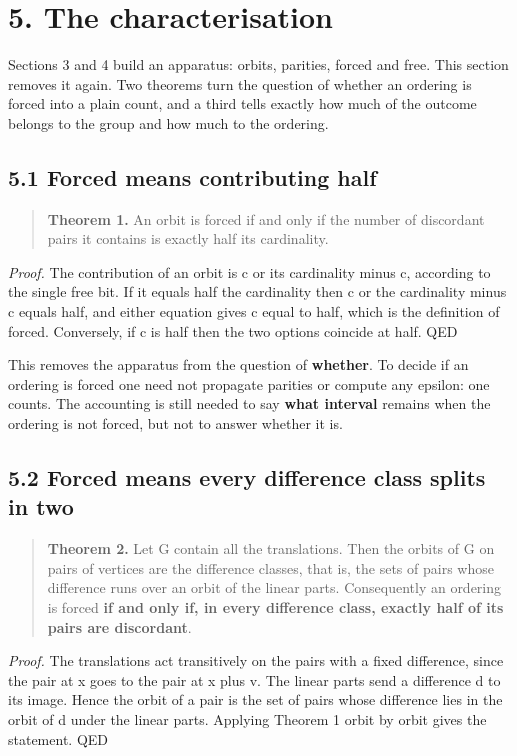 \documentclass[11pt,a4paper]{article}
\begin{document}
\section*{5. The characterisation}

Sections 3 and 4 build an apparatus: orbits, parities, forced and free. This section removes it again. Two theorems turn the question of whether an ordering is forced into a plain count, and a third tells exactly how much of the outcome belongs to the group and how much to the ordering.

\subsection*{5.1 Forced means contributing half}

\begin{quote}
\textbf{Theorem 1.} An orbit is forced if and only if the number of discordant pairs it contains is exactly half its cardinality.
\end{quote}

\emph{Proof.} The contribution of an orbit is c or its cardinality minus c, according to the single free bit. If it equals half the cardinality then c or the cardinality minus c equals half, and either equation gives c equal to half, which is the definition of forced. Conversely, if c is half then the two options coincide at half. QED

This removes the apparatus from the question of \textbf{whether}. To decide if an ordering is forced one need not propagate parities or compute any epsilon: one counts. The accounting is still needed to say \textbf{what interval} remains when the ordering is not forced, but not to answer whether it is.

\subsection*{5.2 Forced means every difference class splits in two}

\begin{quote}
\textbf{Theorem 2.} Let G contain all the translations. Then the orbits of G on pairs of vertices are the difference classes, that is, the sets of pairs whose difference runs over an orbit of the linear parts. Consequently an ordering is forced \textbf{if and only if, in every difference class, exactly half of its pairs are discordant}.
\end{quote}

\emph{Proof.} The translations act transitively on the pairs with a fixed difference, since the pair at x goes to the pair at x plus v. The linear parts send a difference d to its image. Hence the orbit of a pair is the set of pairs whose difference lies in the orbit of d under the linear parts. Applying Theorem 1 orbit by orbit gives the statement. QED
\end{document}
